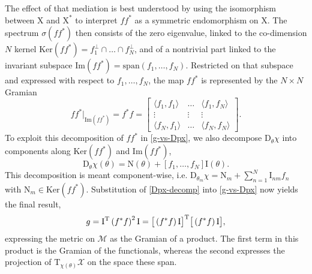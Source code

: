 \documentclass{article}
\newcommand{\D}{\mathrm{D}}
\newcommand{\p}{\theta}
\newcommand{\fmr}{\chi}
\newcommand{\fmm}{\mathcal{X}}
\newcommand{\omr}{\mu}
\newcommand{\omm}{\mathcal{M}}
\newcommand{\fms}{\mathrm{X}}
\newcommand{\be}{\begin{equation}}
\newcommand{\ee}{\end{equation}}
\begin{document}
The effect of that mediation is best understood by using the isomorphism between $\fms$ and $\fms^*$ to interpret $f f^*$ as a symmetric endomorphism on $\fms$.
The spectrum $\sigma(f f^*)$ then consists of the zero eigenvalue, linked to the co-dimension $N$ kernel $\mathrm{Ker}(f f^*) = f_1^\perp \cap \ldots \cap f_N^\perp$, and of a nontrivial part linked to the invariant subspace $\mathrm{Im}(f f^*) = \mathrm{span}(f_1,\ldots,f_N)$.
Restricted on that subspace and expressed with respect to $f_1,\ldots,f_N$, the map $f f^*$ is represented by the $N \times N$ Gramian
%
\[
 f f^*\vert_{\mathrm{Im}(f f^*)}
=
 f^* f
=
\left[\begin{array}{ccc}
 \langle f_1,f_1\rangle
&
 \ldots
&
 \langle f_1,f_N\rangle
\\
 \vdots
&
 \vdots
&
 \vdots
\\
 \langle f_N,f_1\rangle
&
 \ldots
&
 \langle f_N,f_N\rangle
\end{array}\right] .
\]
%
To exploit this decomposition of $f f^*$ in \eqref{g-vs-Dpx}, we also decompose $\D_\p\fmr$ into components along $\mathrm{Ker}(f f^*)$ and $\mathrm{Im}(f f^*)$,
%
\be
 \D_\p\fmr(\p)
=
 \mathrm{N}(\p)
+
 \left[ f_1 , \ldots , f_N \right]
 \mathrm{I}(\p) .
\label{Dpx-decomp}
\ee
%
This decomposition is meant component-wise, i.e. $\D_{\p_m}\fmr = \mathrm{N}_m +  \sum_{n=1}^N \mathrm{I}_{nm} f_n$ with $\mathrm{N}_m\in\mathrm{Ker}(f f^*)$.
Substitution of \eqref{Dpx-decomp} into \eqref{g-vs-Dpx} now yields the final result,
%
\be
 g%
=
 \mathrm{I}^{\rm T} %
\left(
 f^* f
\right)^2
 \mathrm{I}
=
 \big[\left(f^* f\right) \mathrm{I}\big]^{\rm T}
 \big[\left(f^* f\right) \mathrm{I}\big] , %
\label{g-ito-proj}
\ee
%
expressing the metric on $\omm$ as the Gramian of a product.
The first term in this product is the Gramian of the functionals, whereas the second expresses the projection of $\mathrm{T}_{\fmr(\p)}\fmm$ on the space these span.\\
\end{document}
